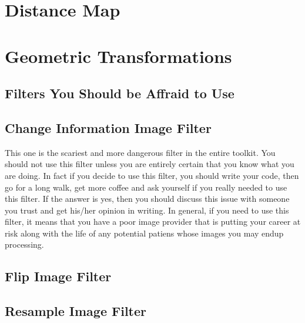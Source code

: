 \ifitkFullVersion

\fi



\section{Distance Map}
\label{sec:DistanceMap}

\ifitkFullVersion

\fi



\section{Geometric Transformations}
\label{sec:GeometricalTransformationFilters}

\subsection{Filters You Should be Affraid to Use}

\label{sec:ScaryImageFilters}
\subsection{Change Information Image Filter}

This one is the scariest and more dangerous filter in the entire toolkit. You
should not use this filter unless you are entirely certain that you know what
you are doing. In fact if you decide to use this filter, you should write your
code, then go for a long walk, get more coffee and ask yourself if you really
needed to use this filter. If the answer is yes, then you should discuss this
issue with someone you trust and get his/her opinion in writing.  In general,
if you need to use this filter, it means that you have a poor image provider
that is putting your career at risk along with the life of any potential
patiens whose images you may endup processing.

\subsection{Flip Image Filter}

\ifitkFullVersion

\fi

\subsection{Resample Image Filter}
\label{sec:ResampleImageFilter}

